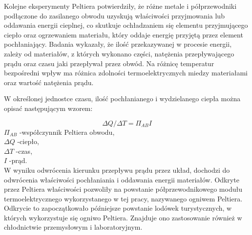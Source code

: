 Kolejne eksperymenty Peltiera potwierdziły, że różne metale i półprzewodniki podłączone do zasilanego obwodu uzyskują właściwości przyjmowania lub oddawania energii cieplnej, co skutkuje ochładzaniem się elementu przyjmującego ciepło oraz ogrzewaniem materiału, który oddaje energię przyjętą przez element pochłaniający. Badania wykazały, że ilość przekazywanej w procesie energii, zależy od materiałów, z których wykonano części, natężenia przepływającego prądu oraz czasu jaki przepływał przez obwód. Na różnicę temperatur bezpośredni wpływ ma różnica zdolności termoelektrycznych miedzy materiałami oraz wartość natężenia prądu.

W określonej jednostce czasu, ilość pochłanianego i wydzielanego ciepła można opisać następującym wzorem:

\begin{equation}
	\Delta Q / \Delta T= \Pi _{AB} I
\end{equation}
\begin{math}
	\Pi _{AB} 
\end{math} 
-współczynnik Peltiera obwodu,	\\
\begin{math}
	\Delta Q
\end{math} 
-ciepło,	\\
\begin{math}
	\Delta T
\end{math}  
-czas,	\\
\begin{math}
	I
\end{math} 
-prąd.\\

W wyniku odwrócenia kierunku przepływu prądu przez układ, dochodzi do odwrócenia właściwości pochłaniania i oddawania energii materiałów.
Odkryte przez Peltiera właściwości pozwoliły na powstanie półprzewodnikowego modułu termoelektrycznego wykorzystanego w tej pracy, nazywanego ogniwem Peltiera. Odkrycie to zapoczątkowało późniejsze powstanie lodówek turystycznych, w których wykorzystuje się ogniwo Peltiera. Znajduje ono zastosowanie również w chłodnictwie przemysłowym i laboratoryjnym.

